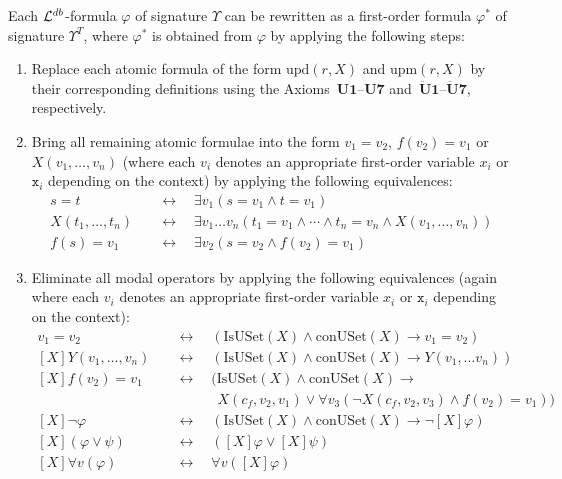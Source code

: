 \documentclass[preprint,11pt]{elsarticle}
\theoremstyle{definition}
\theoremstyle{remark}
\begin{document}
Each ${\cal L}^{db}$-formula $\varphi$ of signature $\Upsilon$ can be rewritten as a first-order formula $\varphi^*$ of signature $\Upsilon^T$, where $\varphi^*$ is obtained from $\varphi$ by applying the following steps:
\begin{enumerate}
\item Replace each atomic formula of the form $\mathrm{upd}(r, X)$ and $\mathrm{upm}(r, X)$ by their corresponding definitions using the Axioms~$\mathbf{U1}$--$\mathbf{U7}$ and~$\mathbf{\ddot{U}1}$--$\mathbf{\ddot{U}7}$, respectively. 
\item Bring all remaining atomic formulae into the form $v_1 = v_2$, $f(v_2) = v_1$ or $X(v_1, \ldots, v_n)$ (where each $v_i$ denotes an appropriate first-order variable $x_i$ or $\mathtt{x}_i$ depending on the context) by applying the following equivalences:
\begin{align*}
s=t & \quad \leftrightarrow \quad \exists v_1 (s = v_1 \wedge t = v_1)\\
X(t_1, \ldots, t_n) & \quad \leftrightarrow \quad \exists v_1 \ldots v_n (t_1 = v_1 \wedge \cdots \wedge t_n = v_n \wedge X(v_1, \ldots, v_n))\\
f(s) = v_1 & \quad \leftrightarrow \quad \exists v_2 (s = v_2 \wedge f(v_2) = v_1) 
\end{align*}
\item Eliminate all modal operators by applying the following equivalences (again where each $v_i$ denotes an appropriate first-order variable $x_i$ or $\mathtt{x}_i$ depending on the context):
\begin{align*}
[X]v_1=v_2 & \quad \leftrightarrow \quad (\mathrm{IsUSet}(X) \wedge \mathrm{conUSet}(X)\rightarrow v_1=v_2) \\ 
[X]Y(v_1, \ldots, v_n) & \quad \leftrightarrow \quad (\mathrm{IsUSet}(X) \wedge \mathrm{conUSet}(X)\rightarrow Y(v_1, \ldots v_n)) \\
[X]f(v_2) = v_1 & \quad \leftrightarrow \quad (\mathrm{IsUSet}(X) \wedge \mathrm{conUSet}(X)\rightarrow \\
& \qquad \qquad X(c_f, v_2, v_1) \vee \forall v_3 (\neg X(c_f, v_2, v_3) \wedge f(v_2) = v_1))\\
[X]\neg \varphi & \quad \leftrightarrow \quad (\mathrm{IsUSet}(X) \wedge \mathrm{conUSet}(X)\rightarrow \neg [X]\varphi) \\
[X](\varphi \vee \psi) & \quad \leftrightarrow \quad ([X]\varphi \vee [X]\psi) \\
[X]\forall v (\varphi)& \quad \leftrightarrow \quad \forall v ([X] \varphi)\\

\end{align*}
\end{enumerate}
\end{document}
